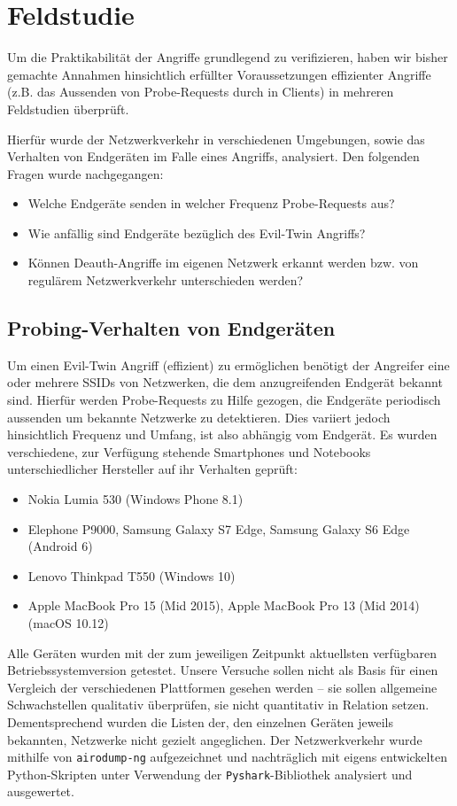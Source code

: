 \section{Feldstudie}
Um die Praktikabilität der Angriffe grundlegend zu verifizieren, haben wir bisher gemachte Annahmen hinsichtlich erfüllter Voraussetzungen effizienter Angriffe (z.B. das Aussenden von Probe-Requests durch in Clients) in mehreren Feldstudien überprüft.

Hierfür wurde der Netzwerkverkehr in verschiedenen Umgebungen, sowie das Verhalten von Endgeräten im Falle eines Angriffs, analysiert.
Den folgenden Fragen wurde nachgegangen:
\begin{itemize}
	\item Welche Endgeräte senden in welcher Frequenz Probe-Requests aus?
	\item Wie anfällig sind Endgeräte bezüglich des Evil-Twin Angriffs?
	\item Können Deauth-Angriffe im eigenen Netzwerk erkannt werden bzw. von regulärem Netzwerkverkehr unterschieden werden?
\end{itemize}

\subsection{Probing-Verhalten von Endgeräten}\label{subs:praxisprobes}
Um einen Evil-Twin Angriff (effizient) zu ermöglichen benötigt der Angreifer eine oder mehrere SSIDs von Netzwerken, die dem anzugreifenden Endgerät bekannt sind.
Hierfür werden Probe-Requests zu Hilfe gezogen, die Endgeräte periodisch aussenden um bekannte Netzwerke zu detektieren.
Dies variiert jedoch hinsichtlich Frequenz und Umfang, ist also abhängig vom Endgerät.
Es wurden verschiedene, zur Verfügung stehende Smartphones und Notebooks unterschiedlicher Hersteller auf ihr Verhalten geprüft:
\begin{itemize}
	\item Nokia Lumia 530 (Windows Phone 8.1)
	\item Elephone P9000, Samsung Galaxy S7 Edge, Samsung Galaxy S6 Edge (Android 6)
	\item Lenovo Thinkpad T550 (Windows 10)
	\item Apple MacBook Pro 15 (Mid 2015), Apple MacBook Pro 13 (Mid 2014) (macOS 10.12)
\end{itemize}
Alle Geräten wurden mit der zum jeweiligen Zeitpunkt aktuellsten verfügbaren Betriebssystemversion getestet. Unsere Versuche sollen nicht als Basis für einen Vergleich der verschiedenen Plattformen gesehen werden -- sie sollen allgemeine Schwachstellen qualitativ überprüfen, sie nicht quantitativ in Relation setzen. Dementsprechend wurden die Listen der, den einzelnen Geräten jeweils bekannten, Netzwerke nicht gezielt angeglichen. Der Netzwerkverkehr wurde mithilfe von \texttt{airodump-ng} aufgezeichnet und nachträglich mit eigens entwickelten Python-Skripten unter Verwendung der \texttt{Pyshark}-Bibliothek analysiert und ausgewertet.\\

